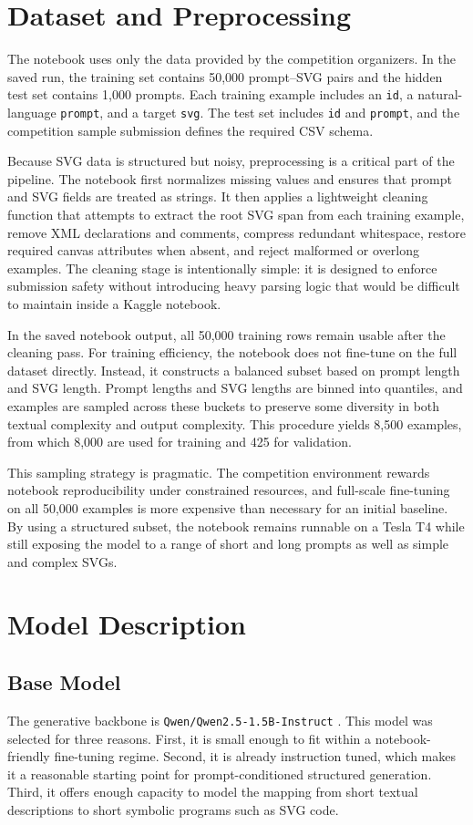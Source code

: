 \documentclass[11pt]{article}
\begin{document}
\section{Dataset and Preprocessing}
The notebook uses only the data provided by the competition organizers. In the saved run, the training set contains 50,000 prompt--SVG pairs and the hidden test set contains 1,000 prompts. Each training example includes an \texttt{id}, a natural-language \texttt{prompt}, and a target \texttt{svg}. The test set includes \texttt{id} and \texttt{prompt}, and the competition sample submission defines the required CSV schema.

Because SVG data is structured but noisy, preprocessing is a critical part of the pipeline. The notebook first normalizes missing values and ensures that prompt and SVG fields are treated as strings. It then applies a lightweight cleaning function that attempts to extract the root SVG span from each training example, remove XML declarations and comments, compress redundant whitespace, restore required canvas attributes when absent, and reject malformed or overlong examples. The cleaning stage is intentionally simple: it is designed to enforce submission safety without introducing heavy parsing logic that would be difficult to maintain inside a Kaggle notebook.

In the saved notebook output, all 50,000 training rows remain usable after the cleaning pass. For training efficiency, the notebook does not fine-tune on the full dataset directly. Instead, it constructs a balanced subset based on prompt length and SVG length. Prompt lengths and SVG lengths are binned into quantiles, and examples are sampled across these buckets to preserve some diversity in both textual complexity and output complexity. This procedure yields 8,500 examples, from which 8,000 are used for training and 425 for validation.

This sampling strategy is pragmatic. The competition environment rewards notebook reproducibility under constrained resources, and full-scale fine-tuning on all 50,000 examples is more expensive than necessary for an initial baseline. By using a structured subset, the notebook remains runnable on a Tesla T4 while still exposing the model to a range of short and long prompts as well as simple and complex SVGs.

\section{Model Description}
\subsection{Base Model}
The generative backbone is \texttt{Qwen/Qwen2.5-1.5B-Instruct} \citep{qwen25}. This model was selected for three reasons. First, it is small enough to fit within a notebook-friendly fine-tuning regime. Second, it is already instruction tuned, which makes it a reasonable starting point for prompt-conditioned structured generation. Third, it offers enough capacity to model the mapping from short textual descriptions to short symbolic programs such as SVG code.
\end{document}
